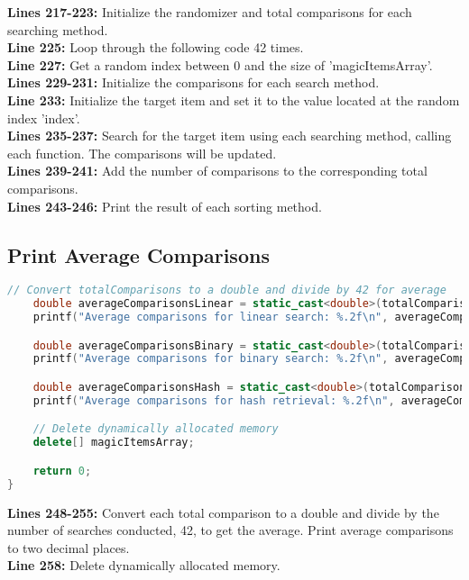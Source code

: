 \documentclass[letterpaper, 10pt,DIV=13]{scrartcl}
\numberwithin{equation}{section} %
\numberwithin{figure}{section} %
\numberwithin{table}{section} %
\begin{document}
\textbf{Lines 217-223:} Initialize the randomizer and total comparisons for each searching method. \\
\textbf{Line 225:} Loop through the following code 42 times. \\
\textbf{Line 227:} Get a random index between 0 and the size of 'magicItemsArray'. \\
\textbf{Lines 229-231:} Initialize the comparisons for each search method. \\
\textbf{Line 233:} Initialize the target item and set it to the value located at the random index 'index'. \\
\textbf{Lines 235-237:} Search for the target item using each searching method, calling each function. The comparisons will be updated. \\
\textbf{Lines 239-241:} Add the number of comparisons to the corresponding total comparisons. \\
\textbf{Lines 243-246:} Print the result of each sorting method.

\subsection{Print Average Comparisons}
\begin{linenumbers}
\begin{lstlisting}[language=C++, caption={Print Average Comparisons}, label={code:example}]
    // Convert totalComparisons to a double and divide by 42 for average
    double averageComparisonsLinear = static_cast<double>(totalComparisonsLinear) / 42;
    printf("Average comparisons for linear search: %.2f\n", averageComparisonsLinear); 

    double averageComparisonsBinary = static_cast<double>(totalComparisonsBinary) / 42;
    printf("Average comparisons for binary search: %.2f\n", averageComparisonsBinary);

    double averageComparisonsHash = static_cast<double>(totalComparisonsHash) / 42;
    printf("Average comparisons for hash retrieval: %.2f\n", averageComparisonsHash);

    // Delete dynamically allocated memory
    delete[] magicItemsArray;

	return 0;
}
\end{lstlisting}
\end{linenumbers}
\nolinenumbers

\textbf{Lines 248-255:} Convert each total comparison to a double and divide by the number of searches conducted, 42, to get the average. Print average comparisons to two decimal places. \\
\textbf{Line 258:} Delete dynamically allocated memory.
\end{document}

